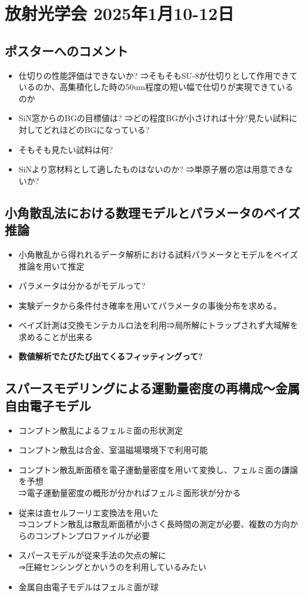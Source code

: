 \documentclass[a4paper,12pt]{ltjsreport}
\begin{document}
\section*{放射光学会 2025年1月10-12日}
\subsection*{ポスターへのコメント}
\begin{itemize}
  \item 仕切りの性能評価はできないか?
        ⇒そもそもSU-8が仕切りとして作用できているのか、高集積化した時の50um程度の短い幅で仕切りが実現できているのか
  \item SiN窓からのBGの目標値は?
        ⇒どの程度BGが小さければ十分?見たい試料に対してどれほどのBGになっている?
  \item そもそも見たい試料は何?
  \item SiNより窓材料として適したものはないのか?
        ⇒単原子層の窓は用意できないか?
\end{itemize}
\subsection*{小角散乱法における数理モデルとパラメータのベイズ推論}
\begin{itemize}
  \item 小角散乱から得れれるデータ解析における試料パラメータとモデルをベイズ推論を用いて推定
  \item パラメータは分かるがモデルって?
  \item 実験データから条件付き確率を用いてパラメータの事後分布を求める。
  \item ベイズ計測は交換モンテカルロ法を利用⇒局所解にトラップされず大域解を求めることが出来る
  \item \textbf{数値解析でたびたび出てくるフィッティングって?}
\end{itemize}
\subsection*{スパースモデリングによる運動量密度の再構成～金属自由電子モデル}
\begin{itemize}
  \item コンプトン散乱によるフェルミ面の形状測定
  \item コンプトン散乱は合金、室温磁場環境下で利用可能
  \item コンプトン散乱断面積を電子運動量密度を用いて変換し、フェルミ面の謙譲を予想\\
        ⇒電子運動量密度の概形が分かればフェルミ面形状が分かる
  \item 従来は直セルフーリエ変換法を用いた\\
        ⇒コンプトン散乱は散乱断面積が小さく長時間の測定が必要、複数の方向からのコンプトンプロファイルが必要
  \item スパースモデルが従来手法の欠点の解に\\
        ⇒圧縮センシングとかいうのを利用しているみたい
  \item 金属自由電子モデルはフェルミ面が球
\end{itemize}
\end{document}
